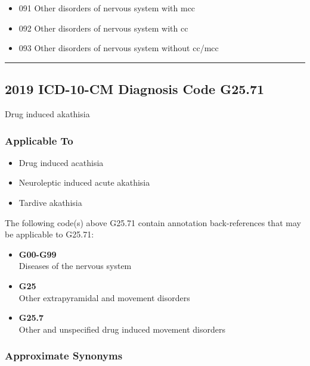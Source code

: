 \begin{paracol}{2}
\begin{leftcolumn}
\begin{itemize}
\tightlist
\item
  091 Other disorders of nervous system with mcc
\item
  092 Other disorders of nervous system with cc
\item
  093 Other disorders of nervous system without cc/mcc
\end{itemize}

\begin{center}\rule{0.5\linewidth}{\linethickness}\end{center}

\hypertarget{icd-10-cm-diagnosis-code-g25.71}{%
\subsection{2019 ICD-10-CM Diagnosis Code G25.71}\label{icd-10-cm-diagnosis-code-g25.71}}

\noindent Drug induced akathisia

\hypertarget{applicable-to-1}{%
\subsubsection{Applicable To}\label{applicable-to-1}}

\begin{itemize}
\tightlist
\item
  Drug induced acathisia
\item
  Neuroleptic induced acute akathisia
\item
  Tardive akathisia
\end{itemize}

\noindent The following code(s) above G25.71 contain annotation back-references that may be applicable to G25.71:

\begin{itemize}
\tightlist
\item
  \textbf{G00-G99}\\
  Diseases of the nervous system
\item
  \textbf{G25}\\
  Other extrapyramidal and movement disorders
\item
  \textbf{G25.7}\\
  Other and unspecified drug induced movement disorders
\end{itemize}

\hypertarget{approximate-synonyms-1}{%
\subsubsection{Approximate Synonyms}\label{approximate-synonyms-1}}


\end{leftcolumn}
\end{paracol}

